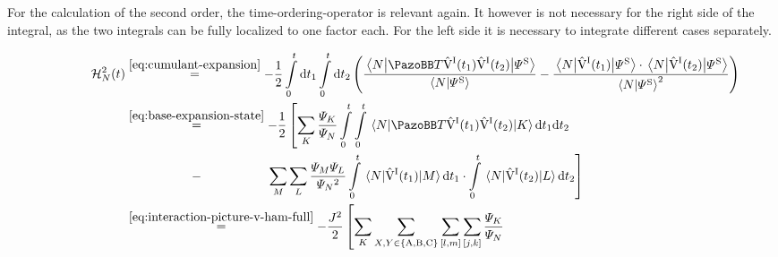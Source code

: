 For the calculation of the second order, the time-ordering-operator is relevant again. 
It however is not necessary for the right side of the integral, as the two integrals can be fully localized to one factor each.
For the left side it is necessary to integrate different cases separately.

\vspace{-0.2cm} %

\begin{equation}
    \label{eq:hn-integrated-second-order}
    \begin{split}
        \HNOftOrder{2} &\stackrel{\ref{eq:cumulant-expansion}}{=} - \frac{1}{2} \int\limits_0^t\mathrm{d}t_1 \int\limits_0^t\mathrm{d}t_2
        \left(
        \frac{\bracketHelper{N}{\timeOrderingOperator
        \VhamiltonianOf[\interactionPicture]{t_1}\VhamiltonianOf[\interactionPicture]{t_2}
        }{\picturePsi[\schroedingerPicture]{}}}{\braketHelper{N}{\picturePsi[\schroedingerPicture]{}}} -  \frac{\bracketHelper{N}{\VhamiltonianOf[\interactionPicture]{t_1}}{\picturePsi[\schroedingerPicture]{}} \cdot \bracketHelper{N}{\VhamiltonianOf[\interactionPicture]{t_2}}{\picturePsi[\schroedingerPicture]{}}}{\braketHelper{N}{\picturePsi[\schroedingerPicture]{}}^2}
        \right)
        \hspace{-1.3cm} %
        \\
        &\stackrel{\ref{eq:base-expansion-state}}{=}
        - \frac{1}{2} 
        \left[
        \lsum[K] \frac{\psiN[K]}{\psiN} \int\limits_0^t \int\limits_0^t        \bracketHelper{N}{\timeOrderingOperator
        \VhamiltonianOf[\interactionPicture]{t_1}\VhamiltonianOf[\interactionPicture]{t_2}
        }{K}            \mathrm{d}t_1\mathrm{d}t_2 \right. \\
        &\stackrel{\phantom{\ref{eq:base-expansion-state}}}{-} 
        \left.
        \lsum[M]\lsum[L]
        \frac{\psiN[M]\psiN[L]}{\psiN{}^2}
        \int\limits_0^t \bracketHelper{N}{\VhamiltonianOf[\interactionPicture]{t_1}}{M}  \mathrm{d}t_1
        \cdot
        \int\limits_0^t \bracketHelper{N}{\VhamiltonianOf[\interactionPicture]{t_2}}{L}  \mathrm{d}t_2 \right]\\
        &\stackrel{\ref{eq:interaction-picture-v-ham-full}}{=}
        - \frac{J^2}{2} 
        \left[
        \lsum[K]\lsum[X,Y \in \left\{\text{A}, \text{B}, \text{C}\right\}] \fullneighborsum{l}{m}\fullneighborsum{j}{k}
        \frac{\psiN[K]}{\psiN} \right. \\&\quad

\end{split}
\end{equation}
